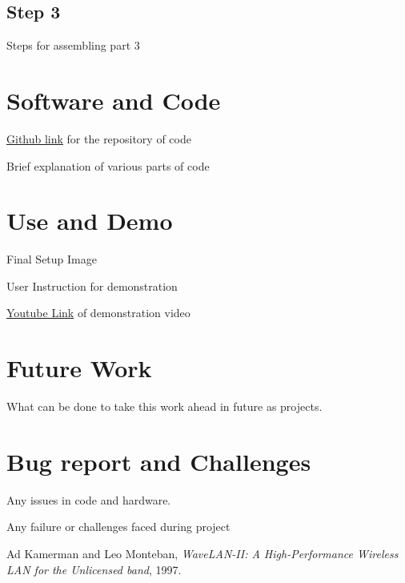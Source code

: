 \documentclass[a4paper,12pt,oneside]{book}
\begin{document}
\subsection*{Step 3}
Steps for assembling part 3



\section{Software and Code}
\href{http://www.github.com}{Github link} for the repository of code

Brief explanation of various parts of code 

\section{Use and Demo}
Final Setup Image

User Instruction for demonstration

\href{http://www.youtube.com}{Youtube Link} of demonstration video 

\section{Future Work}
What can be done to take this work ahead in future as projects.

\section{Bug report and Challenges}
Any issues in code and hardware.

Any failure or challenges faced during project

\begin{thebibliography}{li}
Ad Kamerman and Leo Monteban,
{\em WaveLAN-II: A High-Performance Wireless LAN for the Unlicensed band},
1997.

\end{thebibliography}
\end{document}
